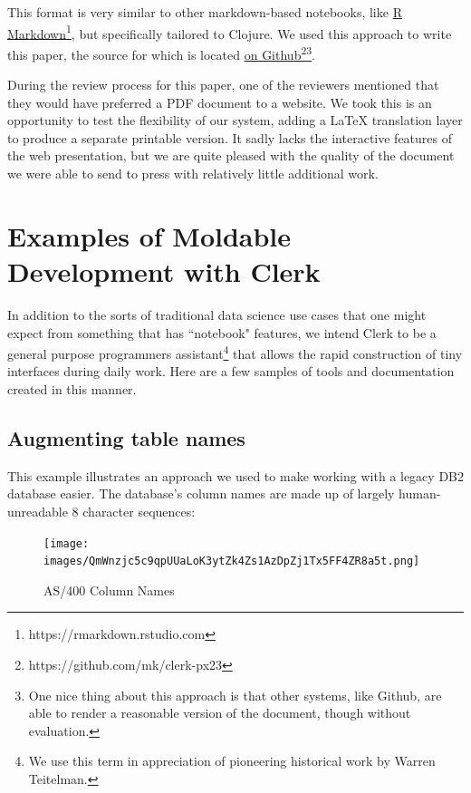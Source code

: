 \documentclass[sigconf,screen]{acmart}
\begin{document}
This format is very similar to other markdown-based notebooks, like {\href{https://rmarkdown.rstudio.com}{R Markdown}\footnote{https://rmarkdown.rstudio.com}}, but specifically tailored to Clojure. We used this approach to write this paper, the source for which is located {\href{https://github.com/mk/clerk-px23}{on Github}\footnote{https://github.com/mk/clerk-px23}}\footnote{One nice thing about this approach is that other systems, like Github, are able to render a reasonable version of the document, though without evaluation.}.

During the review process for this paper, one of the reviewers mentioned that they would have preferred a PDF document to a website. We took this is an opportunity to test the flexibility of our system, adding a LaTeX translation layer to produce a separate printable version. It sadly lacks the interactive features of the web presentation, but we are quite pleased with the quality of the document we were able to send to press with relatively little additional work.

\hypertarget{examples-of-moldable-development-with-clerk}{%
\section{Examples of Moldable Development with Clerk}\label{examples-of-moldable-development-with-clerk}}

In addition to the sorts of traditional data science use cases that one might expect from something that has ``notebook" features, we intend Clerk to be a general purpose programmer\textquotesingle s assistant\footnote{We use this term in appreciation of pioneering historical work by Warren Teitelman.} that allows the rapid construction of tiny interfaces during daily work. Here are a few samples of tools and documentation created in this manner.

\hypertarget{augmenting-table-names}{%
\subsection{Augmenting table names}\label{augmenting-table-names}}

This example illustrates an approach we used to make working with a legacy DB2 database easier. The database's column names are made up of largely human-unreadable 8 character sequences:

\begin{figure}
\hypertarget{as400-column-names}{%
\centering
\texttt{[image: images/QmWnzjc5c9qpUUaLoK3ytZk4Zs1AzDpZj1Tx5FF4ZR8a5t.png]}
\caption{AS/400 Column Names}\label{as400-column-names}
}
\end{figure}
\end{document}
